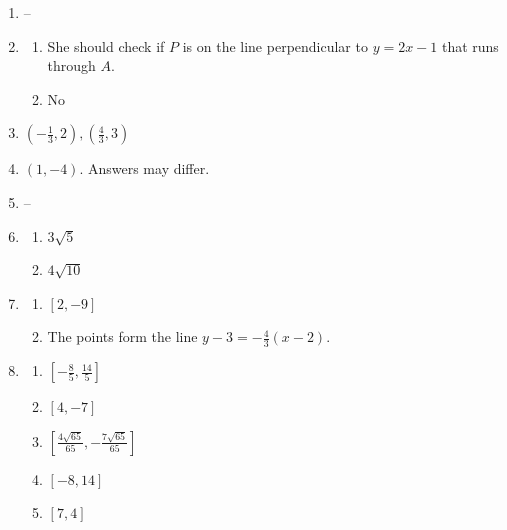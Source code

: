 \documentclass{article}
\begin{document}
\begin{enumerate}
\begin{enumerate}
	\end{enumerate}
	
\item --

\item \begin{enumerate}

	\item She should check if $P$ is on the line perpendicular to $y=2x-1$ that runs through $A$.
	
	\item No
	
	\end{enumerate}
	
\item $(-\frac{1}{3}, 2), (\frac{4}{3}, 3)$

\item $(1, -4)$. Answers may differ.

\item --

\item \begin{enumerate}

	\item $3\sqrt{5}$
	
	\item $4\sqrt{10}$
	
	\end{enumerate}
	
\item \begin{enumerate}

	\item $[2, -9]$
	
	\item The points form the line $y - 3 = -\frac{4}{3}(x - 2)$.

	\end{enumerate}
	
\item \begin{enumerate}

	\item $[-\frac{8}{5}, \frac{14}{5}]$
	
	\item $[4, -7]$
	
	\item $\left[ \frac{4\sqrt{65}}{65}, -\frac{7\sqrt{65}}{65} \right]$
	
	\item $[-8, 14]$
	
	\item $[7, 4]$
	

\end{enumerate}
\end{enumerate}
\end{document}
